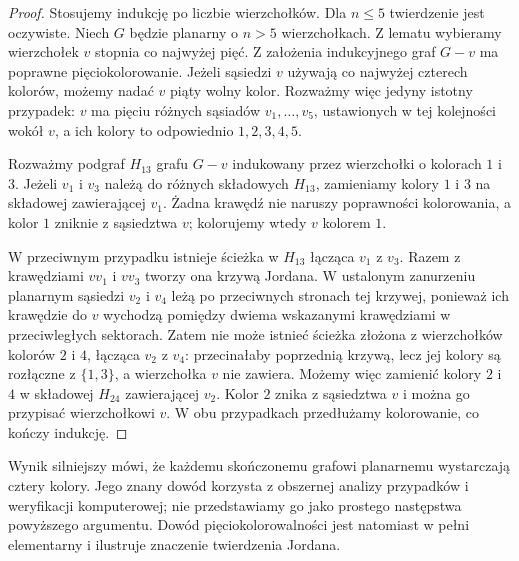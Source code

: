 \begin{proof}
Stosujemy indukcję po liczbie wierzchołków. Dla
$n\le5$ twierdzenie jest oczywiste. Niech $G$
będzie planarny o $n>5$ wierzchołkach. Z lematu wybieramy
wierzchołek $v$ stopnia co najwyżej pięć. Z założenia
indukcyjnego graf $G-v$ ma poprawne pięciokolorowanie.
Jeżeli sąsiedzi $v$ używają co najwyżej czterech kolorów,
możemy nadać $v$ piąty wolny kolor. Rozważmy więc
jedyny istotny przypadek: $v$ ma pięciu różnych sąsiadów
$v_1,\ldots,v_5$, ustawionych w tej kolejności wokół $v$,
a ich kolory to odpowiednio $1,2,3,4,5$.

Rozważmy podgraf $H_{13}$ grafu $G-v$ indukowany przez
wierzchołki o kolorach $1$ i $3$. Jeżeli $v_1$ i $v_3$
należą do różnych składowych $H_{13}$, zamieniamy
kolory $1$ i $3$ na składowej zawierającej $v_1$.
Żadna krawędź nie naruszy poprawności kolorowania,
a kolor $1$ zniknie z sąsiedztwa $v$; kolorujemy wtedy
$v$ kolorem $1$.

W przeciwnym przypadku istnieje ścieżka w $H_{13}$
łącząca $v_1$ z $v_3$. Razem z krawędziami
$vv_1$ i $vv_3$ tworzy ona krzywą Jordana.
W ustalonym zanurzeniu planarnym sąsiedzi $v_2$ i $v_4$
leżą po przeciwnych stronach tej krzywej, ponieważ
ich krawędzie do $v$ wychodzą pomiędzy dwiema wskazanymi
krawędziami w przeciwległych sektorach.
Zatem nie może istnieć ścieżka złożona z wierzchołków
kolorów $2$ i $4$, łącząca $v_2$ z $v_4$:
przecinałaby poprzednią krzywą, lecz jej kolory są
rozłączne z $\{1,3\}$, a wierzchołka $v$ nie zawiera.
Możemy więc zamienić kolory $2$ i $4$ w składowej
$H_{24}$ zawierającej $v_2$. Kolor $2$ znika
z sąsiedztwa $v$ i można go przypisać wierzchołkowi $v$.
W obu przypadkach przedłużamy kolorowanie, co kończy indukcję.
\end{proof}

\begin{center}
\end{center}

\begin{uwaga}
Wynik silniejszy mówi, że każdemu skończonemu grafowi planarnemu
wystarczają cztery kolory. Jego znany dowód korzysta
z obszernej analizy przypadków i weryfikacji komputerowej;
nie przedstawiamy go jako prostego następstwa powyższego
argumentu. Dowód pięciokolorowalności jest natomiast
w pełni elementarny i ilustruje znaczenie twierdzenia Jordana.
\end{uwaga}



